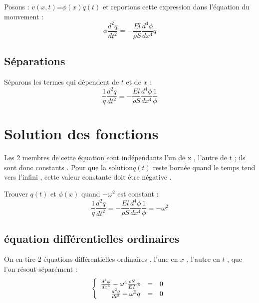 \documentclass[a4paper,10pt]{report} %
\begin{document}
Posons : $v(x,t)$=$\phi(x)q(t)$ et reportons cette expression dans l'équation du mouvement :
\begin{equation}
	\phi\frac{d^2{q}}{d{t}^2}=-\frac{El}{\rho S}\frac{d^4{\phi}}{d{x}^4}q
	\label{equantion2}
\end{equation}


\subsection{Séparations}
Séparons les termes qui dépendent de $t$ et de $x$ :
\begin{equation}
    \frac{1}{q}\frac{d^2{q}}{d{t}^2}=-\frac{El}{\rho S}\frac{d^4{\phi}}{d{x}^4}\frac{1}{\phi}
    \label{equantion3}
\end{equation}

\section{Solution des fonctions}

Les 2 membres de cette équation sont indépendants l'un de x , l'autre de t ; ils sont donc constants . Pour que la solution$q(t)$ reste bornée quand le temps tend vers l'infini , cette valeur constante doit être négative .
\begin{center}
Trouver $q(t)$ et $\phi(x)$ quand $-\omega^2$ est constant :
	\begin{equation}
		\frac{1}{q}\frac{d^2{q}}{d{t}^2}=-\frac{El}{\rho S}\frac{d^4{\phi}}{d{x}^4}\frac{1}{\phi}=-\omega^2
		\label{equation4}
	\end{equation}
\end{center}


\subsection{équation différentielles ordinaires}

On en tire 2 équations différentielles ordinaires , l'une en $x$ , l'autre en $t$ , que l'on résout séparément :
\begin{equation}
	\left\{
    \begin{array}{r c l }
        \frac{d^4\phi}{dx^4}-\omega^4\frac{\rho S}{EI}\phi&=&0\\
        \frac{d^2q}{dt^2}+\omega^2 q&=&0
    \end{array}
    \right.
\end{equation}
\end{document}
